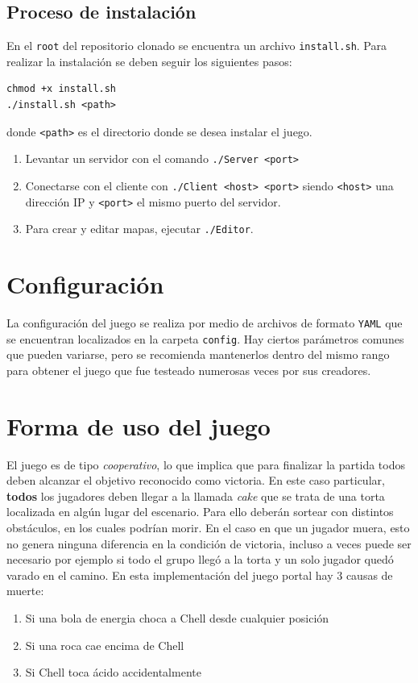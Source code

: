 \documentclass[a4paper]{article}
\begin{document}
\subsection{Proceso de instalación}

En el \texttt{root} del repositorio clonado se encuentra un archivo \texttt{install.sh}. Para realizar la instalación se deben seguir los siguientes pasos:

\begin{verbatim}
chmod +x install.sh
./install.sh <path>
\end{verbatim}
donde \texttt{<path>} es el directorio donde se desea instalar el juego.

\begin{enumerate}
	\item Levantar un servidor con el comando \texttt{./Server <port>}
	\item Conectarse con el cliente con \texttt{./Client <host> <port>} siendo \texttt{<host>} una dirección IP y \texttt{<port>} el mismo puerto del servidor.
	\item Para crear y editar mapas, ejecutar \texttt{./Editor}.
\end{enumerate}

\section{Configuración}

La configuración del juego se realiza por medio de archivos de formato \texttt{YAML} que se encuentran localizados en la carpeta \texttt{config}. Hay ciertos parámetros comunes que pueden variarse, pero se recomienda mantenerlos dentro del mismo rango para obtener el juego que fue testeado numerosas veces por sus creadores.

\section{Forma de uso del juego}
El juego es de tipo \textit{cooperativo}, lo que implica que para finalizar la partida todos deben alcanzar el objetivo reconocido como victoria. En este caso particular, \textbf{todos} los jugadores deben llegar a la llamada \textit{cake} que se trata de una torta localizada en algún lugar del escenario. Para ello deberán sortear con distintos obstáculos, en los cuales podrían morir. En el caso en que un jugador muera, esto no genera ninguna diferencia en la condición de victoria, incluso a veces puede ser necesario por ejemplo si todo el grupo llegó a la torta y un solo jugador quedó varado en el camino. En esta implementación del juego portal hay 3 causas de muerte:
\begin{enumerate}
	\item Si una bola de energia choca a Chell desde cualquier posición
	\item Si una roca cae encima de Chell
	\item Si Chell toca ácido accidentalmente
\end{enumerate}
\end{document}
